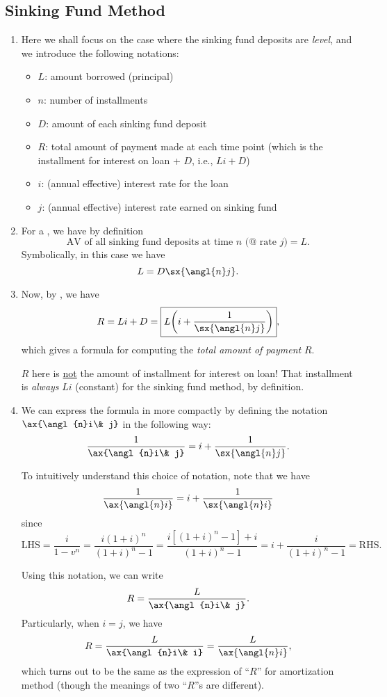 \subsection{Sinking Fund Method}
\begin{enumerate}
\item Here we shall focus on the case where the sinking fund deposits are
\emph{level}, and we introduce the following notations:
\begin{itemize}
\item \(L\): amount borrowed (principal)
\item \(n\): number of installments
\item \(D\): amount of each sinking fund deposit
\item \(R\): total amount of payment made at each time point (which is the
installment for interest on loan  + \(D\), i.e., \(Li+D\))
\item \(i\): (annual effective) interest rate for the loan
\item \(j\): (annual effective) interest rate earned on sinking fund
\end{itemize}
\item \label{it:sinking-fund-def}
For a , we have by definition
\[
\text{AV of all sinking fund deposits at time \(n\) (@ rate \(j\))} = L.
\]
Symbolically, in this case we have
\[
L=D\sx{\angl{n}j}.
\]
\item \label{it:sinking-fund-total-payment-amt-fmla}
Now, by , we have
\[
R=Li+D=\boxed{L\qty(i+\frac{1}{\sx{\angl{n}j}})},
\]
which gives a formula for computing the \emph{total amount of payment} \(R\).

\begin{warning}
\(R\) here is \underline{not} the amount of installment for interest on loan!
That installment is \emph{always} \(Li\) (constant) for the sinking fund
method, by definition.
\end{warning}
\item We can express the formula in
 more compactly by defining
the notation \(\ax{\angl{n}i\& j}\) in the following way:
\[
\frac{1}{\ax{\angl{n}i\& j}}=i+\frac{1}{\sx{\angl{n}j}}.
\]
\begin{intuition}
To intuitively understand this choice of notation, note that we have
\[
\frac{1}{\ax{\angl{n}i}}=i+\frac{1}{\sx{\angl{n}i}}
\]
since
\[
\text{LHS}=\frac{i}{1-v^n}=\frac{i(1+i)^{n}}{(1+i)^{n}-1}
=\frac{i[(1+i)^{n}-1]+i}{(1+i)^{n}-1}
=i+\frac{i}{(1+i)^n-1}
=\text{RHS}.
\]
\end{intuition}

Using this notation, we can write
\[
R=\frac{L}{\ax{\angl{n}i\& j}}.
\]
Particularly, when \(i=j\), we have
\[
R=\frac{L}{\ax{\angl{n}i\& i}}=\frac{L}{\ax{\angl{n}i}},
\]
which turns out to be the same as the expression of ``\(R\)'' for amortization
method (though the meanings of two ``\(R\)''s are different).
\end{enumerate}

